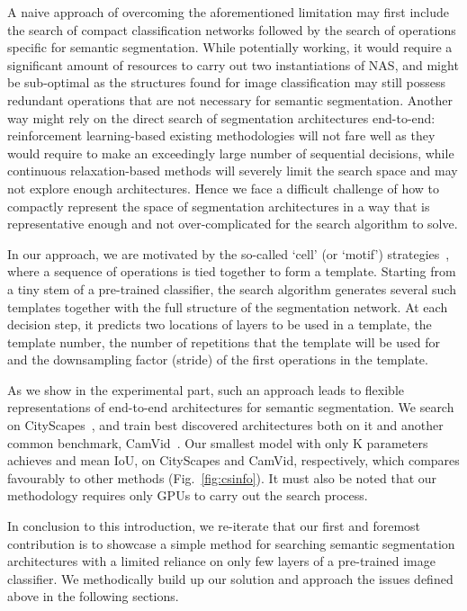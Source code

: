 \documentclass[10pt,twocolumn,letterpaper]{article}
\begin{document}
A naive approach of overcoming the aforementioned limitation may first include the search of compact classification networks followed by the search of operations specific for semantic segmentation. While potentially working, it would require a significant amount of resources to carry out two instantiations of NAS, and might be sub-optimal as the structures found for image classification may still possess redundant operations that are not necessary for semantic segmentation. Another way might rely on the direct search of segmentation architectures end-to-end: reinforcement learning-based existing methodologies will not fare well as they would require to make an exceedingly large number of sequential decisions, while continuous relaxation-based methods will severely limit the search space and may not explore enough architectures. Hence we face a difficult challenge of how to compactly represent the space of segmentation architectures in a way that is representative enough and not over-complicated for the search algorithm to solve.

In our approach, we are motivated by the so-called `cell' (or `motif') strategies~\cite{ZophVSL17,abs-1711-00436}, where a sequence of operations is tied together to form a template. Starting from a tiny stem of a pre-trained classifier, the search algorithm generates several such templates together with the full structure of the segmentation network. At each decision step, it predicts two locations of layers to be used in a template, the template number, the number of repetitions that the template will be used for and the downsampling factor (stride) of the first operations in the template.

As we show in the experimental part, such an approach leads to flexible representations of end-to-end architectures for semantic segmentation. We search on CityScapes~\cite{CordtsORREBFRS16}, and train best discovered architectures both on it and another common benchmark, CamVid~\cite{BrostowFC09}. Our smallest model with only K parameters achieves  and  mean IoU, on CityScapes and CamVid, respectively, which compares favourably to other methods (Fig.~\ref{fig:csinfo}).
It must also be noted that our methodology requires only  GPUs to carry out the search process.

In conclusion to this introduction, we re-iterate that our first and foremost contribution is to showcase a simple method for searching semantic segmentation architectures with a limited reliance on only few layers of a pre-trained image classifier.  We methodically build up our solution and approach the issues defined above in the following sections.
\end{document}
